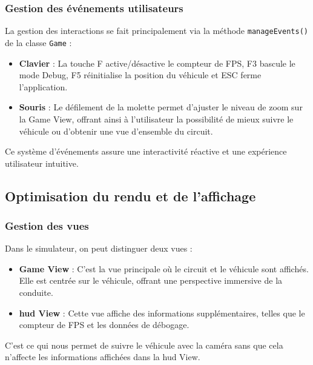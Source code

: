 \subsubsection{Gestion des événements utilisateurs}\label{subsubsec:gestion-des-evenements-utilisateurs}
La gestion des interactions se fait principalement via la méthode \texttt{manageEvents()} de la classe \texttt{Game} :
\begin{itemize}
    \item \textbf{Clavier} : La touche F active/désactive le compteur de FPS, F3 bascule le mode Debug, F5 réinitialise la position du véhicule et ESC ferme l'application.
    \item \textbf{Souris} : Le défilement de la molette permet d'ajuster le niveau de zoom sur la Game View, offrant ainsi à l'utilisateur la possibilité de mieux suivre le véhicule ou d'obtenir une vue d'ensemble du circuit.
\end{itemize}
Ce système d'événements assure une interactivité réactive et une expérience utilisateur intuitive.

\subsection{Optimisation du rendu et de l'affichage}\label{subsec:optimisation-du-rendu-et-de-l-affichage}
\subsubsection{Gestion des vues}\label{subsubsec:gestion-des-vues}
Dans le simulateur, on peut distinguer deux vues :
\begin{itemize}
    \item \textbf{Game View} : C'est la vue principale où le circuit et le véhicule sont affichés.
    Elle est centrée sur le véhicule, offrant une perspective immersive de la conduite.
    \item \textbf{\gls{hud} View} : Cette vue affiche des informations supplémentaires, telles que le compteur de FPS et les données de débogage.
\end{itemize}

C'est ce qui nous permet de suivre le véhicule avec la \og caméra \fg{} sans que cela n'affecte les informations affichées dans la \gls{hud} View.

